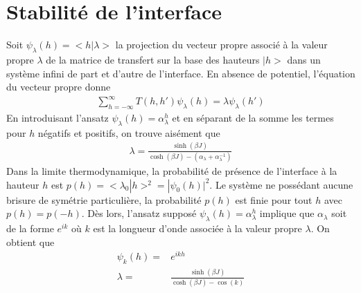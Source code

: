 	\section{Stabilité de l'interface}
	\label{par-stab}

	Soit $\psi_\lambda(h)= <h|\lambda>$ la projection du vecteur propre associé à la valeur propre $\lambda$ de la matrice de transfert sur la base des hauteurs $|h>$ dans un système infini de part et d'autre de l'interface. En absence de potentiel\cite{guyer_sine-gordon_1979,chui_pinning_1981}, l'équation du vecteur propre donne
\begin{align}
	\sum_{h=-\infty}^\infty T(h,h') \psi_\lambda(h) = \lambda \psi_\lambda(h')
\end{align}
En introduisant l'ansatz $\psi_\lambda(h) = \alpha_{\lambda}^h$ et en séparant de la somme les termes pour $h$ négatifs et positifs, on trouve aisément que 
\begin{align}
	\lambda = \frac{\sinh(\beta J)}{\cosh(\beta J)-(\alpha_{\lambda}+\alpha_{\lambda}^{-1})} 
\end{align}
Dans la limite thermodynamique, la probabilité de présence de l'interface à la hauteur $h$ est $p(h) = <\lambda_0|h>^2 = |\psi_0(h)|^2$. Le système ne possédant aucune brisure de symétrie particulière, la probabilité $p(h)$ est finie pour tout $h$ avec $p(h)=p(-h)$. Dès lors, l'ansatz supposé $\psi_\lambda(h) = \alpha_{\lambda}^h$ implique que $\alpha_{\lambda}$ soit de la forme $e^{ik}$ où $k$ est la longueur d'onde associée à la valeur propre $\lambda$. On obtient que 
\begin{align}
	\psi_k(h) =& e^{ikh} \\
	\lambda =& \frac{\sinh(\beta J)}{\cosh(\beta J) - \cos(k)}
	\label{lambda-sos}
\end{align}

